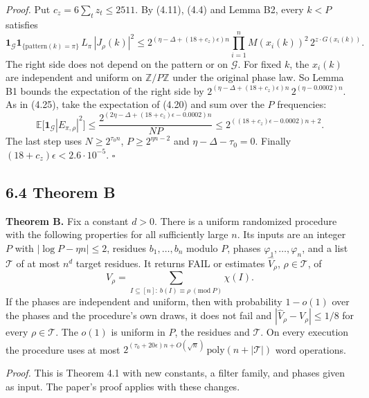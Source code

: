 \documentclass[10pt,a4paper]{article}
\begin{document}
\emph{Proof.} Put $c_z = 6\sum_tz_t \le 2511$. By (4.11), (4.4) and Lemma B2, every $k < P$ satisfies
\[\mathbf 1_{\mathcal G}\mathbf 1_{\{\mathrm{pattern}(k) = \pi\}}\,L_\pi\,|J_\rho(k)|^2 \le
2^{(\eta - \Delta + (18 + c_z)\epsilon)n}\prod_{i=1}^nM(x_i(k))^2\,2^{z\cdot G(x_i(k))}.\]
The right side does not depend on the pattern or on $\mathcal G$. For fixed $k$, the $x_i(k)$ are independent and uniform
on $\mathbb Z/P\mathbb Z$ under the original phase law. So Lemma B1 bounds the expectation of the right side by
$2^{(\eta - \Delta + (18 + c_z)\epsilon)n}\,2^{(\eta - 0.0002)n}$. As in (4.25), take the expectation of (4.20) and sum over
the $P$ frequencies:
\[\mathbb E\big[\mathbf 1_{\mathcal G}|E_{\pi,\rho}|^2\big] \le \frac{2^{(2\eta - \Delta + (18 + c_z)\epsilon - 0.0002)n}}{NP}
\le 2^{((18 + c_z)\epsilon - 0.0002)n + 2}.\]
The last step uses $N \ge 2^{\tau_0 n}$, $P \ge 2^{\eta n - 2}$ and $\eta - \Delta - \tau_0 = 0$. Finally
$(18 + c_z)\epsilon < 2.6\cdot10^{-5}$. $\square$

\subsection*{6.4 Theorem B}

\textbf{Theorem B.} Fix a constant $d > 0$. There is a uniform randomized procedure with the following properties for all
sufficiently large $n$. Its inputs are an integer $P$ with $|\log P - \eta n| \le 2$, residues $b_1, \dots, b_n$ modulo
$P$, phases $\varphi_1, \dots, \varphi_n$, and a list $\mathcal T$ of at most $n^d$ target residues. It returns FAIL or
estimates $\hat V_\rho$, $\rho \in \mathcal T$, of
\[V_\rho = \sum_{I\subseteq[n]:\ b(I)\equiv\rho\ (\mathrm{mod}\ P)}\chi(I).\]
If the phases are independent and uniform, then with probability $1 - o(1)$ over the phases and the procedure's own
draws, it does not fail and $|\hat V_\rho - V_\rho| \le 1/8$ for every $\rho \in \mathcal T$. The $o(1)$ is uniform in
$P$, the residues and $\mathcal T$. On every execution the procedure uses at most
$2^{(\tau_0 + 20\epsilon)n + O(\sqrt n)}\,\mathrm{poly}(n + |\mathcal T|)$ word operations.

\emph{Proof.} This is Theorem 4.1 with new constants, a filter family, and phases given as input. The paper's proof applies
with these changes.
\end{document}
